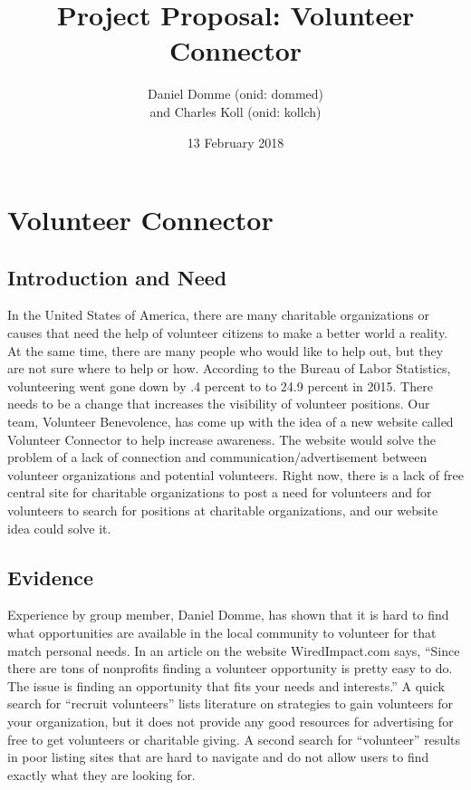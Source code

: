 \documentclass[12pt]{article}
\title{Project Proposal: Volunteer Connector}
\author{Daniel Domme (onid: dommed) \\and Charles Koll (onid: kollch)}
\date{13 February 2018}
\begin{document}
\maketitle
\tableofcontents



\section{Volunteer Connector}
\subsection{Introduction and Need}
 In the United States of America, there are many charitable organizations or causes that need the help of volunteer citizens to make a better world a reality.  At the same time, there are many people who would like to help out, but they are not sure where to help or how.  According to the Bureau of Labor Statistics, volunteering went gone down by .4 percent to to 24.9 percent in 2015.\cite{bls}  There needs to be a change that increases the visibility of volunteer positions.  Our team, Volunteer Benevolence, has come up with the idea of a new website called Volunteer Connector to help increase awareness.  The website would solve the problem of a lack of connection and communication/advertisement between volunteer organizations and potential volunteers.  Right now, there is a lack of free central site for charitable organizations to post a need for volunteers and for volunteers to search for positions at charitable organizations, and our website idea could solve it.\\

\subsection{Evidence}
Experience by group member, Daniel Domme, has shown that it is hard to find what opportunities are available in the local community to volunteer for that match personal needs. In an article on the website WiredImpact.com says, ``Since there are tons of nonprofits finding a volunteer opportunity is pretty easy to do.  The issue is finding an opportunity that fits your needs and interests.'' \cite{volwebsite} A quick search for ``recruit volunteers'' lists literature on strategies to gain volunteers for your organization, but it does not provide any good resources for advertising for free to get volunteers or charitable giving.  A second search for ``volunteer'' results in poor listing sites that are hard to navigate and do not allow users to find exactly what they are looking for.  \\
\end{document}
